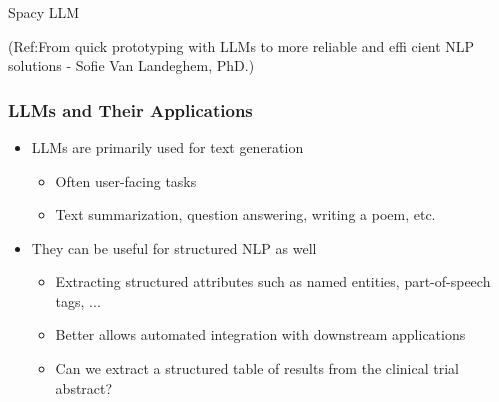 \begin{frame}[fragile]\frametitle{}

\begin{center}
{\Large Spacy LLM}

{\tiny (Ref:From quick prototyping with LLMs to more reliable and effi cient NLP solutions - Soﬁe Van Landeghem, PhD.)}

\end{center}
\end{frame}


\begin{frame}[fragile]\frametitle{LLMs and Their Applications}

	\begin{itemize}
	\item LLMs are primarily used for text generation
	 \begin{itemize}
	 \item Often user-facing tasks
	 \item Text summarization, question answering, writing a poem, etc.
	 \end{itemize}
	\item They can be useful for structured NLP as well
	 \begin{itemize}
	 \item Extracting structured attributes such as named entities, part-of-speech tags, ...
	 \item Better allows automated integration with downstream applications
     \item Can we extract a structured table of results from the clinical trial abstract?
	 \end{itemize}
	\end{itemize}

\end{frame}


